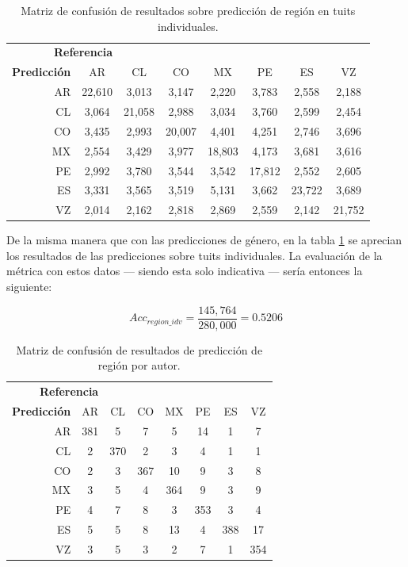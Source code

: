 \begin{table}
\centering
\begin{tabular}{r | c c c c c c c}
\multicolumn{3}{c}{\textbf{Referencia}} \\
\textbf{Predicción} & AR & CL & CO & MX & PE & ES & VZ\\
\hline
AR & 22,610 & 3,013 & 3,147 & 2,220 & 3,783 & 2,558 & 2,188 \\
CL & 3,064 & 21,058 & 2,988 & 3,034 & 3,760 & 2,599 & 2,454 \\
CO & 3,435 & 2,993 & 20,007 & 4,401 & 4,251 & 2,746 & 3,696 \\
MX & 2,554 & 3,429 & 3,977 & 18,803 & 4,173 & 3,681 & 3,616 \\
PE & 2,992 & 3,780 & 3,544 & 3,542 & 17,812 & 2,552 & 2,605 \\
ES & 3,331 & 3,565 & 3,519 & 5,131 & 3,662 & 23,722 & 3,689 \\
VZ & 2,014 & 2,162 & 2,818 & 2,869 & 2,559 & 2,142 & 21,752 \\
\end{tabular}
\caption{Matriz de confusión de resultados sobre predicción de región en tuits individuales.}
\label{tab:region_indvtweet}
\end{table}

De la misma manera que con las predicciones de género, en la tabla \ref{tab:region_indvtweet} se aprecian los resultados de las predicciones sobre tuits individuales. La evaluación de la métrica con estos datos --- siendo esta solo indicativa --- sería entonces la siguiente:

$$ Acc_{region\_idv} = \frac{145,764}{280,000} = 0\text{.}5206 $$

\begin{table}
\centering
\begin{tabular}{r| c c c c c c c}
\multicolumn{3}{c}{\textbf{Referencia}} \\
\textbf{Predicción} & AR & CL & CO & MX & PE & ES & VZ\\
\hline
AR & 381 & 5 & 7 & 5 & 14 & 1 & 7 \\
CL & 2 & 370 & 2 & 3 & 4 & 1 & 1 \\
CO & 2 & 3 & 367 & 10 & 9 & 3 & 8 \\
MX & 3 & 5 & 4 & 364 & 9 & 3 & 9 \\
PE & 4 & 7 & 8 & 3 & 353 & 3 & 4 \\
ES & 5 & 5 & 8 & 13 & 4 & 388 & 17 \\
VZ & 3 & 5 & 3 & 2 & 7 & 1 & 354 \\
\end{tabular}
\caption{Matriz de confusión de resultados de predicción de región por autor.}
\label{tab:region_authtweet}
\end{table}

